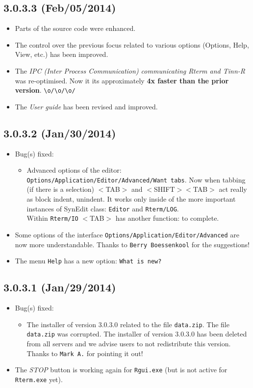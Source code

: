 \subsection*{3.0.3.3 (Feb/05/2014)}
\begin{itemize}
  \item Parts of the source code were enhanced.
  \item The control over the previous focus related to various options (Options, Help, View, etc.) has been improved.
  \item The \textit{IPC (Inter Process Communication) communicating Rterm and Tinn-R} was re-optimised.
   Now it its approximately \textbf{4x faster than the prior version}. \verb|\o/\o/\o/|
  \item The \textit{User guide} has been revised and improved.
\end{itemize}


\subsection*{3.0.3.2 (Jan/30/2014)}
\begin{itemize}
  \item Bug(s) fixed:
    \begin{itemize}
      \item Advanced options of the editor: \texttt{Options/Application/Editor/Advanced/Want tabs}.
       Now when tabbing (if there is a selection) $<$TAB$>$ and $<$SHIFT$>$$<$TAB$>$ act really as block indent, unindent.
       It works only inside of the more important instances of SynEdit class: \texttt{Editor} and \texttt{Rterm/LOG}. \\
       Within \texttt{Rterm/IO} $<$TAB$>$ has another function: to complete.
    \end{itemize}
  \item Some options of the interface \texttt{Options/Application/Editor/Advanced} are now more understandable.
   Thanks to \texttt{Berry Boessenkool} for the suggestions!
  \item The menu \texttt{Help} has a new option: \texttt{What is new?}
\end{itemize}


\subsection*{3.0.3.1 (Jan/29/2014)}
\begin{itemize}
  \item Bug(s) fixed:
    \begin{itemize}
      \item The installer of version 3.0.3.0 related to the file \texttt{data.zip}.
       The file \texttt{data.zip} was corrupted. The installer of version 3.0.3.0 has been deleted from all servers
       and we advise users to not redistribute this version. Thanks to \texttt{Mark A.} for pointing it out!
    \end{itemize}
  \item The \textit{STOP} button is working again for \texttt{Rgui.exe} (but is not active for \texttt{Rterm.exe} yet).
\end{itemize}


